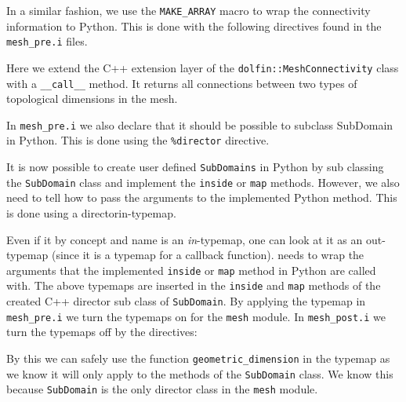 \begin{code}
In a similar fashion, we use the \texttt{MAKE\_}\texttt{ARRAY} macro to wrap the connectivity information to Python. This is done with the following \swig directives found in the \texttt{mesh\_pre.i} files.
Here we extend the C++ extension layer of the \texttt{dolfin::}\texttt{MeshConnectivity} class with a \texttt{\_\_call\_\_} method. It returns all connections between two types of topological dimensions in the mesh.\par

In \texttt{mesh\_pre.i} we also declare that it should be possible to subclass SubDomain in Python. This is done using the \texttt{\%director} directive.
\begin{code}
\end{code}
It is now possible to create user defined \texttt{SubDomains} in Python by sub classing the \texttt{SubDomain} class and implement the \texttt{inside} or \texttt{map} methods. However, we also need to tell \swig how to pass the arguments to the implemented Python method. This is done using a directorin-typemap.
Even if it by concept and name is an \textit{in}-typemap, one can look at it as an out-typemap
(since it is a typemap for a callback function). \swig needs to wrap the arguments that the implemented \texttt{inside} or \texttt{map} method in Python are called with. The above typemaps are inserted in the \texttt{inside} and \texttt{map} methods of the \swig created C++ director sub class of \texttt{SubDomain}. By applying the typemap in \texttt{mesh\_pre.i} we turn the typemaps on for the \texttt{mesh} module. In \texttt{mesh\_post.i} we turn the typemaps off by the directives:
\begin{code}
\end{code}
By this we can safely use the function \texttt{geometric\_dimension} in the typemap as we know it will only apply to the methods of the \texttt{SubDomain} class. We know this because \texttt{SubDomain} is the only director class in the \texttt{mesh} module.\par


\end{code}
